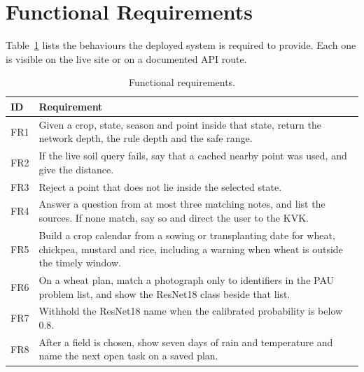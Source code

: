 \section{Functional Requirements}
Table~\ref{tab:fr} lists the behaviours the deployed system is required to provide. Each one is visible on the live site or on a documented API route.

\begin{table}[H]
\centering
\caption{Functional requirements.}
\label{tab:fr}
\small
\begin{tabularx}{\textwidth}{lX}
\toprule
\textbf{ID} & \textbf{Requirement} \\
\midrule
FR1 & Given a crop, state, season and point inside that state, return the network depth, the rule depth and the safe range. \\
FR2 & If the live soil query fails, say that a cached nearby point was used, and give the distance. \\
FR3 & Reject a point that does not lie inside the selected state. \\
FR4 & Answer a question from at most three matching notes, and list the sources. If none match, say so and direct the user to the KVK. \\
FR5 & Build a crop calendar from a sowing or transplanting date for wheat, chickpea, mustard and rice, including a warning when wheat is outside the timely window. \\
FR6 & On a wheat plan, match a photograph only to identifiers in the PAU problem list, and show the ResNet18 class beside that list. \\
FR7 & Withhold the ResNet18 name when the calibrated probability is below 0.8. \\
FR8 & After a field is chosen, show seven days of rain and temperature and name the next open task on a saved plan. \\
\bottomrule
\end{tabularx}
\end{table}

